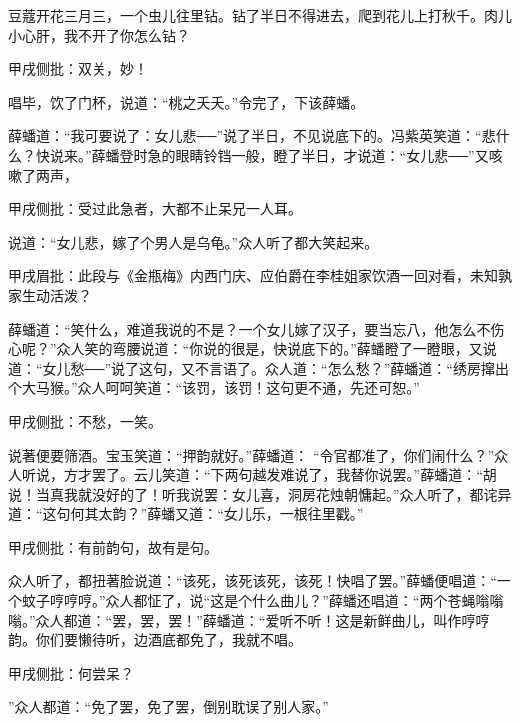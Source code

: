 \begin{poem}
    \begin{pl}
        豆蔻开花三月三，一个虫儿往里钻。钻了半日不得进去，爬到花儿上打秋千。肉儿小心肝，我不开了你怎么钻？\end{pl}
    \begin{note}甲戌侧批：双关，妙！\end{note}
\end{poem}


\begin{parag}
    唱毕，饮了门杯，说道：“桃之夭夭。”令完了，下该薛蟠。
\end{parag}


\begin{parag}
    薛蟠道：“我可要说了：女儿悲──”说了半日，不见说底下的。冯紫英笑道：“悲什么？快说来。”薛蟠登时急的眼睛铃铛一般，瞪了半日，才说道：“女儿悲──”又咳嗽了两声，\begin{note}甲戌侧批：受过此急者，大都不止呆兄一人耳。\end{note}说道：“女儿悲，嫁了个男人是乌龟。”众人听了都大笑起来。\begin{note}甲戌眉批：此段与《金瓶梅》内西门庆、应伯爵在李桂姐家饮酒一回对看，未知孰家生动活泼？\end{note}薛蟠道：“笑什么，难道我说的不是？一个女儿嫁了汉子，要当忘八，他怎么不伤心呢？”众人笑的弯腰说道：“你说的很是，快说底下的。”薛蟠瞪了一瞪眼，又说道：“女儿愁──”说了这句，又不言语了。众人道：“怎么愁？”薛蟠道：“绣房撺出个大马猴。”众人呵呵笑道：“该罚，该罚！这句更不通，先还可恕。”\begin{note}甲戌侧批：不愁，一笑。\end{note}说著便要筛酒。宝玉笑道：“押韵就好。”薛蟠道： “令官都准了，你们闹什么？”众人听说，方才罢了。云儿笑道：“下两句越发难说了，我替你说罢。”薛蟠道：“胡说！当真我就没好的了！听我说罢：女儿喜，洞房花烛朝慵起。”众人听了，都诧异道：“这句何其太韵？”薛蟠又道：“女儿乐，一根往里戳。”\begin{note}甲戌侧批：有前韵句，故有是句。\end{note}众人听了，都扭著脸说道：“该死，该死该死，该死！快唱了罢。”薛蟠便唱道：“一个蚊子哼哼哼。”众人都怔了，说“这是个什么曲儿？”薛蟠还唱道：“两个苍蝇嗡嗡嗡。”众人都道：“罢，罢，罢！”薛蟠道：“爱听不听！这是新鲜曲儿，叫作哼哼韵。你们要懒待听，边酒底都免了，我就不唱。\begin{note}甲戌侧批：何尝呆？\end{note}”众人都道：“免了罢，免了罢，倒别耽误了别人家。”
\end{parag}


